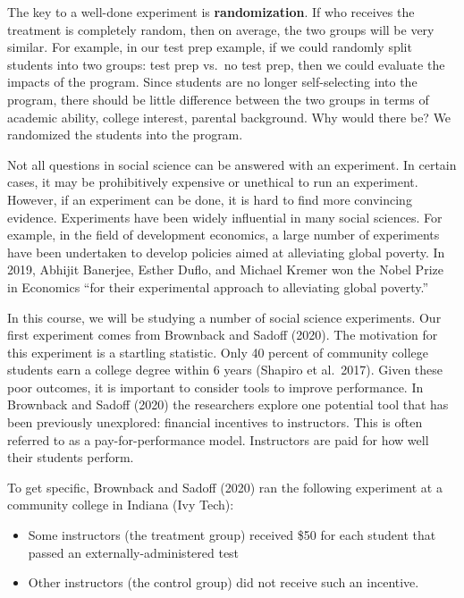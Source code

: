 \documentclass[
]{book}
\providecommand{\tightlist}{%
  \setlength{\itemsep}{0pt}\setlength{\parskip}{0pt}}
\begin{document}
The key to a well-done experiment is \textbf{randomization}. If who receives the treatment is completely random, then on average, the two groups will be very similar. For example, in our test prep example, if we could randomly split students into two groups: test prep vs.~no test prep, then we could evaluate the impacts of the program. Since students are no longer self-selecting into the program, there should be little difference between the two groups in terms of academic ability, college interest, parental background. Why would there be? We randomized the students into the program.

Not all questions in social science can be answered with an experiment. In certain cases, it may be prohibitively expensive or unethical to run an experiment. However, if an experiment can be done, it is hard to find more convincing evidence. Experiments have been widely influential in many social sciences. For example, in the field of development economics, a large number of experiments have been undertaken to develop policies aimed at alleviating global poverty. In 2019, Abhijit Banerjee, Esther Duflo, and Michael Kremer won the Nobel Prize in Economics ``for their experimental approach to alleviating global poverty.''

In this course, we will be studying a number of social science experiments. Our first experiment comes from Brownback and Sadoff (2020). The motivation for this experiment is a startling statistic. Only 40 percent of community college students earn a college degree within 6 years (Shapiro et al.~2017). Given these poor outcomes, it is important to consider tools to improve performance. In Brownback and Sadoff (2020) the researchers explore one potential tool that has been previously unexplored: financial incentives to instructors. This is often referred to as a pay-for-performance model. Instructors are paid for how well their students perform.

To get specific, Brownback and Sadoff (2020) ran the following experiment at a community college in Indiana (Ivy Tech):

\begin{itemize}
\tightlist
\item
  Some instructors (the treatment group) received \$50 for each student that passed an externally-administered test
\item
  Other instructors (the control group) did not receive such an incentive.
\end{itemize}
\end{document}
